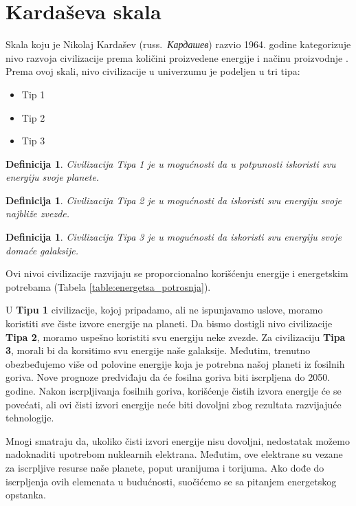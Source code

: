 \documentclass[a4paper]{article}
\newtheorem{defn}[primer]{Definicija}
\begin{document}
\section{Kardaševa skala}

Skala koju je Nikolaj Kardašev (russ.~{\em Кардашев}) razvio 1964. godine kategorizuje nivo razvoja civilizacije prema količini proizvedene energije i načinu proizvodnje \cite{kskala}. Prema ovoj skali, nivo civilizacije u univerzumu je podeljen u tri tipa: 

\begin{itemize}
\item Tip 1
\item Tip 2
\item Tip 3
\end{itemize} 

\begin{defn}
     Civilizacija Tipa 1 je u mogućnosti da u potpunosti iskoristi svu
energiju svoje planete.
\end{defn}

\begin{defn}
    Civilizacija Tipa 2 je u mogućnosti da iskoristi svu energiju svoje najbliže zvezde.
\end{defn}

\begin{defn}
    Civilizacija Tipa 3 je u mogućnosti da iskoristi svu energiju svoje domaće galaksije.
\end{defn}

Ovi nivoi civilizacije razvijaju se proporcionalno korišćenju energije i energetskim potrebama (Tabela \ref{table:energetsa_potrosnja}).

U \textbf{Tipu 1} civilizacije, kojoj pripadamo, ali ne ispunjavamo uslove, moramo koristiti sve čiste izvore energije na planeti. Da bismo dostigli nivo civilizacije \textbf{Tipa 2}, moramo uspešno koristiti svu energiju neke zvezde. Za civilizaciju \textbf{Tipa 3}, morali bi da korsitimo svu energije naše galaksije. Međutim, trenutno obezbeđujemo više od polovine energije koja je potrebna našoj planeti iz fosilnih goriva. Nove prognoze predviđaju da će fosilna goriva biti iscrpljena do 2050. godine. Nakon iscrpljivanja fosilnih goriva, korišćenje čistih izvora energije će se povećati, ali ovi čisti izvori energije neće biti dovoljni zbog rezultata razvijajuće tehnologije.

Mnogi smatraju da, ukoliko čisti izvori energije nisu dovoljni, nedostatak možemo nadoknaditi upotrebom nuklearnih elektrana. Međutim, ove elektrane su vezane za iscrpljive resurse naše planete, poput uranijuma i torijuma. Ako dođe do iscrpljenja ovih elemenata u budućnosti, suočićemo se sa pitanjem energetskog opstanka.
\end{document}
